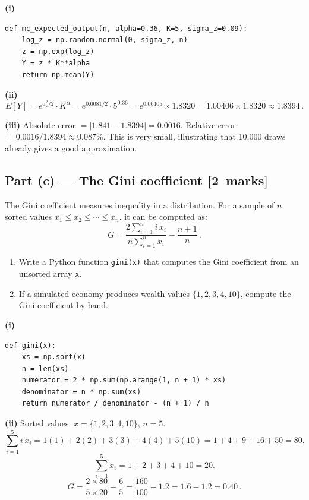 \documentclass[11pt,a4paper]{article}
\newcommand{\mkpts}[1]{\hfill\textbf{[#1~marks]}}
\begin{document}
\begin{solution}
\textbf{(i)}
\begin{lstlisting}[numbers=none]
def mc_expected_output(n, alpha=0.36, K=5, sigma_z=0.09):
    log_z = np.random.normal(0, sigma_z, n)
    z = np.exp(log_z)
    Y = z * K**alpha
    return np.mean(Y)
\end{lstlisting}

\textbf{(ii)}
\[
E[Y] = e^{\sigma_z^2/2} \cdot K^\alpha = e^{0.0081/2} \cdot 5^{0.36} = e^{0.00405} \times 1.8320 = 1.00406 \times 1.8320 \approx \boxed{1.8394}\,.
\]

\textbf{(iii)} Absolute error $= |1.841 - 1.8394| = 0.0016$.  Relative error $= 0.0016/1.8394 \approx 0.087\%$.  This is very small, illustrating that 10,000 draws already gives a good approximation.
\end{solution}

\subsection*{Part (c) --- The Gini coefficient \mkpts{2}}

The Gini coefficient measures inequality in a distribution.  For a sample of $n$ sorted values $x_1 \le x_2 \le \cdots \le x_n$, it can be computed as:
\[
G = \frac{2\sum_{i=1}^{n} i\,x_i}{n\sum_{i=1}^{n} x_i} - \frac{n+1}{n}\,.
\]

\begin{enumerate}[label=(\roman*),nosep]
\item Write a Python function \texttt{gini(x)} that computes the Gini coefficient from an unsorted array \texttt{x}.
\item If a simulated economy produces wealth values $\{1, 2, 3, 4, 10\}$, compute the Gini coefficient by hand.
\end{enumerate}

\begin{solution}
\textbf{(i)}
\begin{lstlisting}[numbers=none]
def gini(x):
    xs = np.sort(x)
    n = len(xs)
    numerator = 2 * np.sum(np.arange(1, n + 1) * xs)
    denominator = n * np.sum(xs)
    return numerator / denominator - (n + 1) / n
\end{lstlisting}

\textbf{(ii)} Sorted values: $x = \{1,2,3,4,10\}$, $n=5$.
\[
\sum_{i=1}^{5} i\,x_i = 1(1) + 2(2) + 3(3) + 4(4) + 5(10) = 1+4+9+16+50 = 80.
\]
\[
\sum_{i=1}^{5} x_i = 1+2+3+4+10 = 20.
\]
\[
G = \frac{2\times 80}{5\times 20} - \frac{6}{5} = \frac{160}{100} - 1.2 = 1.6 - 1.2 = \boxed{0.40}\,.
\]
\end{solution}
\end{document}
